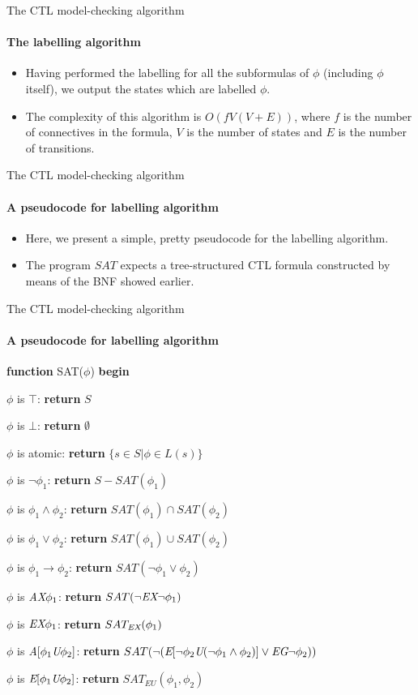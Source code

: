 \begin{frame}{The CTL model-checking algorithm}
	\framesubtitle{The labelling algorithm}
	\begin{itemize}
		\item
		{
			Having performed the labelling for all the subformulas of $\phi$ (including $\phi$
			itself), we output the states which are labelled $\phi$.
			\pause
		}
		\item
		{
			The complexity of this algorithm is $O(f V (V + E))$, where $f$ is the number of connectives in the formula, $V$ is the number of states and $E$ is the number of transitions.
		}
	\end{itemize}
\end{frame}

\begin{frame}{The CTL model-checking algorithm}
	\framesubtitle{A pseudocode for labelling algorithm}
	\begin{itemize}
		\item
		{
			Here, we present a simple, pretty pseudocode for the labelling algorithm.
			\pause
		}
		\item
		{
			The program $SAT$ expects a tree-structured CTL formula constructed by means of the BNF showed earlier.
		}
	\end{itemize}
\end{frame}

\begin{frame}{The CTL model-checking algorithm}
	\framesubtitle{A pseudocode for labelling algorithm}
		{\bf function} SAT($\phi$)
		{\bf begin}\\
		
		\qquad  $\phi$ is $\top$: {\bf return} $S$
		
		\qquad  $\phi$ is $\bot$: {\bf return} $\emptyset$
		
		\qquad  $\phi$ is atomic: {\bf return} $\{ s \in S | \phi \in L(s) \}$
		
		\qquad  $\phi$ is $\neg \phi_{1}$: {\bf return} $S - SAT(\phi_{1})$
		
		\qquad  $\phi$ is $\phi_{1} \land \phi_{2}$: {\bf return} $SAT(\phi_{1}) \cap SAT(\phi_{2})$
		
		\qquad  $\phi$ is $\phi_{1} \lor \phi_{2}$: {\bf return} $SAT(\phi_{1}) \cup SAT(\phi_{2})$
		
		\qquad  $\phi$ is $\phi_{1} \rightarrow \phi_{2}$: {\bf return} $SAT(\neg \phi_{1} \lor \phi_{2})$
		
		\qquad  $\phi$ is $\textit{A}\textit{X} \phi_{1}$: {\bf return} $SAT(\neg\textit{E}\textit{X}\neg \phi_{1})$
		
		\qquad  $\phi$ is $\textit{E}\textit{X} \phi_{1}$: {\bf return} $SAT_{\textit{E}\textit{X}}(\phi_{1})$
		
		\qquad  $\phi$ is $\textit{A}[\phi_{1} \textit{U} \phi_{2}]$: {\bf return} $SAT(\neg( \textit{E}[\neg \phi_{2} \textit{U} (\neg \phi_{1} \land \phi_{2})] \lor \textit{E}\textit{G}\neg \phi_{2} ))$
		
		\qquad  $\phi$ is $\textit{E}[\phi_{1} \textit{U} \phi_{2}]$: {\bf return} $SAT_{EU}(\phi_{1}, \phi_{2})$\\
		
\end{frame}

